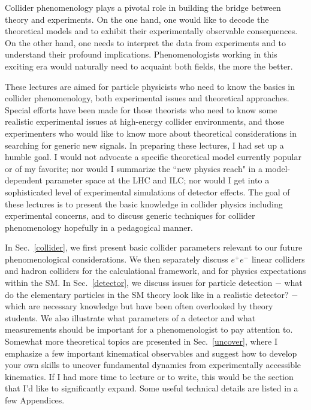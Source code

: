 \documentclass[prd,aps,floats,preprintnumbers,preprint,superscriptaddress,floatfix,nofootinbib]{revtex4}
\def\epem{e^+e^-}
\begin{document}
Collider phenomenology plays a pivotal role in building the 
bridge between theory and experiments. On the one hand,  one would like
to decode the theoretical models and to exhibit their experimentally 
observable consequences. On the other hand, one needs to interpret 
the data from experiments and to understand their profound implications. 
Phenomenologists working in this exciting era would naturally need to acquaint
both fields, the more the better. 

These lectures are aimed for particle physicists who need to know 
the basics in collider phenomenology, both experimental issues and
theoretical approaches.  Special efforts have been made for 
those theorists  who need to know some  realistic experimental issues
at high-energy collider environments,  and those experimenters 
who would like to know more about theoretical considerations 
in searching for generic new signals. In preparing these lectures, 
I had set up a humble goal. I would not advocate
a specific theoretical model currently popular or of my favorite; nor  would I
summarize the ``new physics reach"  in a model-dependent parameter space
at the LHC and ILC; nor would I get into a sophisticated level of experimental
simulations of detector effects.  
The goal of these lectures is to present the basic knowledge 
in collider physics including experimental concerns, 
and to discuss generic techniques for collider 
phenomenology  hopefully in a pedagogical manner. 

In Sec.~\ref{collider}, we first present basic collider parameters relevant to
our future phenomenological considerations. We then separately discuss 
$\epem$ linear colliders and hadron colliders for the calculational framework,
and for physics expectations within the SM. 
In Sec.~\ref{detector}, we discuss issues for particle detection  $-$
what do the elementary particles in the SM theory look like in a realistic
detector? $-$ which
are necessary knowledge but have been often overlooked by theory students. 
We also illustrate  what parameters of a detector and what measurements
should be important for a phenomenologist to pay attention to.  
Somewhat more theoretical topics are presented in Sec.~\ref{uncover}, 
where I emphasize a few important kinematical observables and suggest 
how to develop your own skills to uncover fundamental
dynamics from experimentally accessible kinematics. If I had more time
to lecture or to write,
this would be the section that I'd like to significantly expand. 
Some useful technical details are listed in a few Appendices. 
\end{document}
